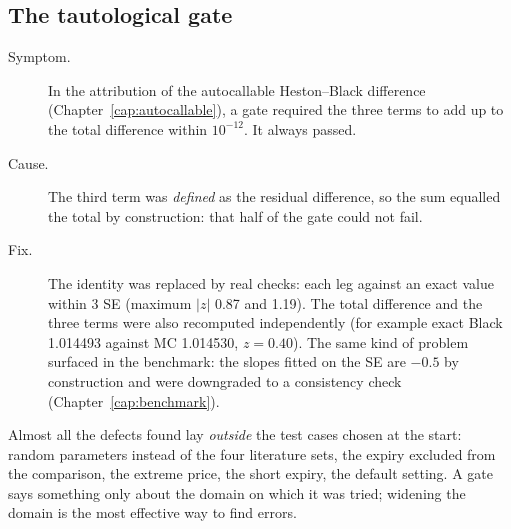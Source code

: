 \subsection{The tautological gate}
\begin{description}
\item[Symptom.] In the attribution of the autocallable Heston--Black difference (Chapter~\ref{cap:autocallable}), a
gate required the three terms to add up to the total difference within $10^{-12}$. It always passed.
\item[Cause.] The third term was \emph{defined} as the residual difference, so the sum equalled the total by
construction: that half of the gate could not fail.
\item[Fix.] The identity was replaced by real checks: each leg against an exact value within 3 SE (maximum $|z|$ 0.87
and 1.19). The total difference and the three terms were also recomputed independently (for example exact Black
1.014493 against MC 1.014530, $z=0.40$). The same kind of problem surfaced in the benchmark: the slopes fitted on the
SE are $-0.5$ by construction and were downgraded to a consistency check (Chapter~\ref{cap:benchmark}).
\end{description}

\begin{idea}[title={Key idea: what these cases teach}]
Almost all the defects found lay \emph{outside} the test cases chosen at the start: random parameters instead of the
four literature sets, the expiry excluded from the comparison, the extreme price, the short expiry, the default
setting. A gate says something only about the domain on which it was tried; widening the domain is the most effective
way to find errors.
\end{idea}

